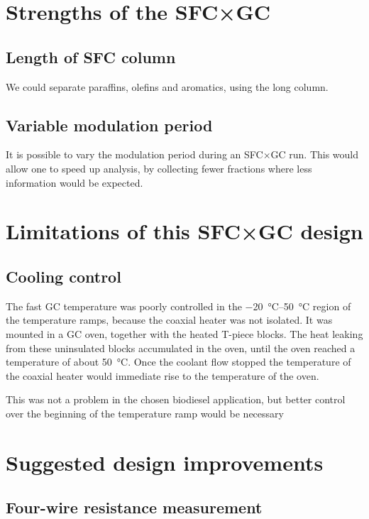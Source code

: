\section{Strengths of the SFC×GC}

\subsection{Length of SFC column}

We could separate paraffins, olefins and aromatics, using the long column.

\subsection{Variable modulation period}

It is possible to vary the modulation period during an SFC×GC run. This would
allow one to speed up analysis, by collecting fewer fractions where less
information would be expected.

\section{Limitations of this SFC×GC design}

\subsection{Cooling control}
The fast GC temperature was poorly controlled in the \SIrange{-20}{50}{\celsius}
region of the temperature ramps, because the coaxial heater was not isolated. It
was mounted in a GC oven, together with the heated T-piece blocks. The heat
leaking from these uninsulated blocks accumulated in the oven, until the oven
reached a temperature of about \SI{50}{\celsius}. Once the coolant flow stopped
the temperature of the coaxial heater would immediate rise to the temperature of
the oven.

This was not a problem in the chosen biodiesel application, but better control
over the beginning of the temperature ramp would be necessary 

\section{Suggested design improvements}

\subsection{Four-wire resistance measurement}

